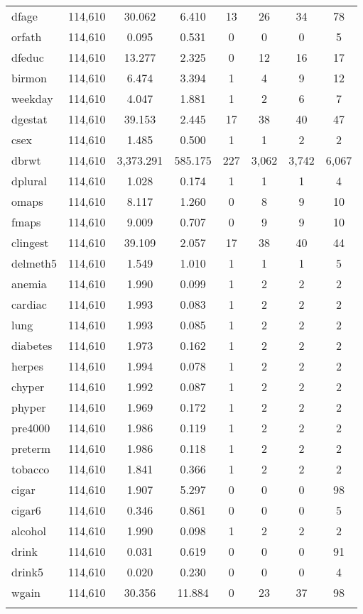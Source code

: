 \begin{table}[!htbp]
\begin{tabular}{@{\extracolsep{5pt}}lccccccc}
dfage & 114,610 & 30.062 & 6.410 & 13 & 26 & 34 & 78 \\ 
orfath & 114,610 & 0.095 & 0.531 & 0 & 0 & 0 & 5 \\ 
dfeduc & 114,610 & 13.277 & 2.325 & 0 & 12 & 16 & 17 \\ 
birmon & 114,610 & 6.474 & 3.394 & 1 & 4 & 9 & 12 \\ 
weekday & 114,610 & 4.047 & 1.881 & 1 & 2 & 6 & 7 \\ 
dgestat & 114,610 & 39.153 & 2.445 & 17 & 38 & 40 & 47 \\ 
csex & 114,610 & 1.485 & 0.500 & 1 & 1 & 2 & 2 \\ 
dbrwt & 114,610 & 3,373.291 & 585.175 & 227 & 3,062 & 3,742 & 6,067 \\ 
dplural & 114,610 & 1.028 & 0.174 & 1 & 1 & 1 & 4 \\ 
omaps & 114,610 & 8.117 & 1.260 & 0 & 8 & 9 & 10 \\ 
fmaps & 114,610 & 9.009 & 0.707 & 0 & 9 & 9 & 10 \\ 
clingest & 114,610 & 39.109 & 2.057 & 17 & 38 & 40 & 44 \\ 
delmeth5 & 114,610 & 1.549 & 1.010 & 1 & 1 & 1 & 5 \\ 
anemia & 114,610 & 1.990 & 0.099 & 1 & 2 & 2 & 2 \\ 
cardiac & 114,610 & 1.993 & 0.083 & 1 & 2 & 2 & 2 \\ 
lung & 114,610 & 1.993 & 0.085 & 1 & 2 & 2 & 2 \\ 
diabetes & 114,610 & 1.973 & 0.162 & 1 & 2 & 2 & 2 \\ 
herpes & 114,610 & 1.994 & 0.078 & 1 & 2 & 2 & 2 \\ 
chyper & 114,610 & 1.992 & 0.087 & 1 & 2 & 2 & 2 \\ 
phyper & 114,610 & 1.969 & 0.172 & 1 & 2 & 2 & 2 \\ 
pre4000 & 114,610 & 1.986 & 0.119 & 1 & 2 & 2 & 2 \\ 
preterm & 114,610 & 1.986 & 0.118 & 1 & 2 & 2 & 2 \\ 
tobacco & 114,610 & 1.841 & 0.366 & 1 & 2 & 2 & 2 \\ 
cigar & 114,610 & 1.907 & 5.297 & 0 & 0 & 0 & 98 \\ 
cigar6 & 114,610 & 0.346 & 0.861 & 0 & 0 & 0 & 5 \\ 
alcohol & 114,610 & 1.990 & 0.098 & 1 & 2 & 2 & 2 \\ 
drink & 114,610 & 0.031 & 0.619 & 0 & 0 & 0 & 91 \\ 
drink5 & 114,610 & 0.020 & 0.230 & 0 & 0 & 0 & 4 \\ 
wgain & 114,610 & 30.356 & 11.884 & 0 & 23 & 37 & 98 \\ 
\hline \\[-1.8ex] 
\end{tabular} 
\end{table} 
